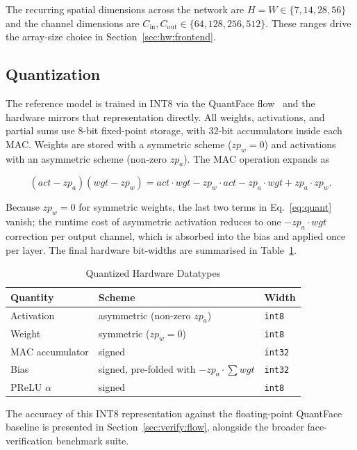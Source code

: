 The recurring spatial dimensions across the network are $H = W \in \{7, 14, 28, 56\}$ and the channel dimensions are $C_\text{in}, C_\text{out} \in \{64, 128, 256, 512\}$. These ranges drive the array-size choice in Section~\ref{sec:hw:frontend}.

\subsection{Quantization}
\label{sec:model:precision}

The reference model is trained in INT8 via the QuantFace flow~\cite{9955645} and the hardware mirrors that representation directly. All weights, activations, and partial sums use 8-bit fixed-point storage, with 32-bit accumulators inside each MAC. Weights are stored with a symmetric scheme ($\textit{zp}_w = 0$) and activations with an asymmetric scheme (non-zero $\textit{zp}_a$). The MAC operation expands as

\begin{equation}
(act - zp_a)(wgt - zp_w) = act \cdot wgt - zp_w \cdot act - zp_a \cdot wgt + zp_a \cdot zp_w.
\label{eq:quant}
\end{equation}

Because $\textit{zp}_w = 0$ for symmetric weights, the last two terms in Eq.~\eqref{eq:quant} vanish; the runtime cost of asymmetric activation reduces to one $-zp_a \cdot wgt$ correction per output channel, which is absorbed into the bias and applied once per layer. The final hardware bit-widths are summarised in Table~\ref{tab:fixed_point}.

\begin{table}[H]
\centering
\caption{Quantized Hardware Datatypes}
\label{tab:fixed_point}
\begin{tabular}{lll}
\toprule
\textbf{Quantity} & \textbf{Scheme} & \textbf{Width} \\
\midrule
Activation     & asymmetric (non-zero $zp_a$) & \texttt{int8} \\
Weight         & symmetric ($zp_w = 0$)       & \texttt{int8} \\
MAC accumulator& signed                       & \texttt{int32} \\
Bias           & signed, pre-folded with $-zp_a \cdot \sum wgt$ & \texttt{int32} \\
PReLU $\alpha$ & signed                       & \texttt{int8} \\
\bottomrule
\end{tabular}
\end{table}

The accuracy of this INT8 representation against the floating-point QuantFace baseline is presented in Section~\ref{sec:verify:flow}, alongside the broader face-verification benchmark suite.
